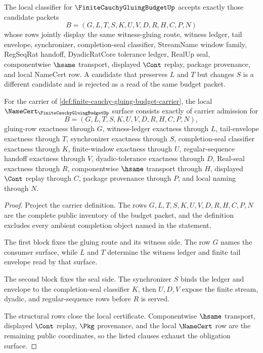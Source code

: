 \begin{definition}
\label{def:finite-cauchy-gluing-budget-classifier}
The local classifier for $\FiniteCauchyGluingBudgetUp$ accepts exactly those candidate packets
$$
B=(G,L,T,S,K,U,V,D,R,H,C,P,N)
$$
whose rows jointly display the same witness-gluing route, witness ledger, tail envelope, synchronizer, completion-seal classifier, StreamName window family, RegSeqRat handoff, DyadicRatCore tolerance ledger, RealUp seal, componentwise $\hsame$ transport, displayed $\Cont$ replay, package provenance, and local NameCert row. A candidate that preserves $L$ and $T$ but changes $S$ is a different candidate and is rejected as a read of the same budget packet.
\end{definition}

\begin{theorem}
\label{thm:finite-cauchy-gluing-budget-obligation-surface}
For the carrier of \autoref{def:finite-cauchy-gluing-budget-carrier}, the local $\NameCert_{\FiniteCauchyGluingBudgetUp}$ surface consists exactly of carrier admission for
$$
B=(G,L,T,S,K,U,V,D,R,H,C,P,N),
$$
gluing-row exactness through $G$, witness-ledger exactness through $L$, tail-envelope exactness through $T$, synchronizer exactness through $S$, completion-seal classifier exactness through $K$, finite-window exactness through $U$, regular-sequence handoff exactness through $V$, dyadic-tolerance exactness through $D$, Real-seal exactness through $R$, componentwise $\hsame$ transport through $H$, displayed $\Cont$ replay through $C$, package provenance through $P$, and local naming through $N$.
\end{theorem}
\begin{proof}
Project the carrier definition. The rows $G,L,T,S,K,U,V,D,R,H,C,P,N$ are the complete public inventory of the budget packet, and the definition excludes every ambient completion object named in the statement.

The first block fixes the gluing route and its witness side. The row $G$ names the consumer surface, while $L$ and $T$ determine the witness ledger and finite tail envelope read by that surface.

The second block fixes the seal side. The synchronizer $S$ binds the ledger and envelope to the completion-seal classifier $K$, then $U,D,V$ expose the finite stream, dyadic, and regular-sequence rows before $R$ is served.

The structural rows close the local certificate. Componentwise $\hsame$ transport, displayed $\Cont$ replay, $\Pkg$ provenance, and the local $\NameCert$ row are the remaining public coordinates, so the listed clauses exhaust the obligation surface.
\end{proof}

